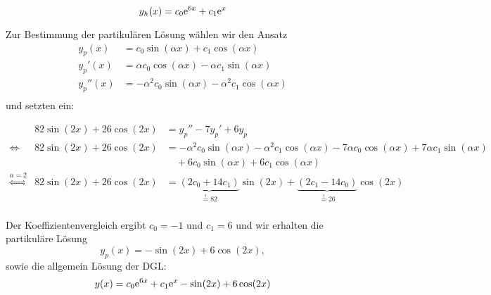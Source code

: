 \documentclass[main.tex]{subfiles}
\begin{document}
$$
    y_h(x) = c_0 \mathrm{e}^{6x} + c_1 \mathrm{e}^{x}
$$

Zur Bestimmung der partikulären Lösung wählen wir den Ansatz
\begin{align*}
    y_p(x)   &= c_0 \sin(\alpha x) + c_1 \cos(\alpha x) \\
    y_p'(x)  &= \alpha c_0 \cos(\alpha x) - \alpha c_1 \sin(\alpha x) \\
    y_p''(x) &= - \alpha^2 c_0 \sin(\alpha x) - \alpha^2 c_1 \cos(\alpha x) \\
\end{align*}
und setzten ein:

\begin{equation*}
\begin{array}{crl}
                & 82\sin(2x) + 26\cos(2x) &= y_p'' - 7y_p' + 6y_p \\
\Leftrightarrow & 82\sin(2x) + 26\cos(2x) &=
    - \alpha^2 c_0 \sin(\alpha x) - \alpha^2 c_1 \cos(\alpha x) 
    - 7\alpha c_0 \cos(\alpha x) + 7\alpha c_1 \sin(\alpha x)\\
    && \quad +6c_0 \sin(\alpha x) + 6c_1 \cos(\alpha x) \\
\overset{\alpha = 2}{\Leftrightarrow} & 82\sin(2x) + 26\cos(2x) &=
    \underbrace{\left(2c_0 + 14c_1\right)}_{\overset{!}{=} 82} \sin(2x)
    + \underbrace{\left(2c_1 - 14c_0\right)}_{\overset{!}{=} 26}\cos(2x) \\
\end{array}
\end{equation*}

Der Koeffizientenvergleich ergibt $c_0 = -1$ und $c_1 = 6$ und wir erhalten die partikuläre Lösung
$$
    y_p(x) = -\sin(2x) + 6\cos(2x),
$$
sowie die allgemein Lösung der DGL:
$$
    y(x) = c_0 \mathrm{e}^{6x} + c_1 \mathrm{e}^{x} -\sin(2x) + 6\cos(2x)
$$
\end{document}
